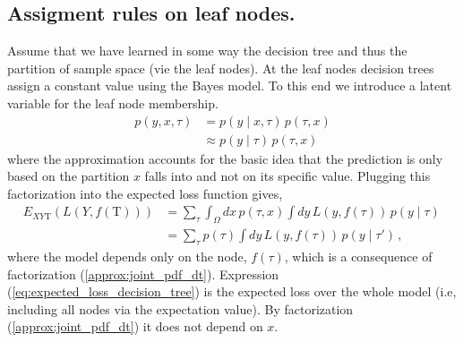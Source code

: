 \documentclass[12pt,a4paper]{article}
\begin{document}
\subsection{Assigment rules on leaf nodes.}
Assume that we have learned in some way the decision tree and thus the partition of sample space (vie the leaf nodes). 
At the leaf nodes decision trees assign a constant value using the Bayes model. To this end we introduce a latent variable for the leaf node membership.
\begin{align}
	p(y, x, \tau) &= p(y \mid x, \tau)\, p(\tau, x) \\ 
	              &\approx p(y \mid \tau)\, p(\tau, x)  \label{approx:joint_pdf_dt}
\end{align}
where the approximation accounts for the basic idea that the prediction is only based on the partition $x$ falls into and not on its specific value. 
Plugging this factorization into the expected loss function gives,
\begin{align}
	E_{XY\mathrm{T}} \left( L(Y, f(\mathrm{T})) \right) 
	&= \sum_{\tau}   \int_\Omega dx  \, p(\tau, x) \int dy\,L(y, f(\tau)) \, p(y \mid \tau)\,  \\
	&= \sum_{\tau}   p(\tau) \int dy\,L(y, f(\tau)) \, p(y \mid \tau')\,  
	\label{eq:expected_loss_decision_tree},
\end{align}
where the model depends only on the node, $f(\tau)$, which is a consequence of factorization (\ref{approx:joint_pdf_dt}). Expression (\ref{eq:expected_loss_decision_tree}) is the expected loss over the whole model (i.e, including all nodes via the expectation value). By factorization (\ref{approx:joint_pdf_dt}) it does not depend on $x$.
\end{document}
